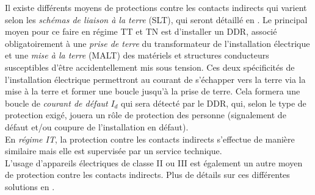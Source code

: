Il existe différents moyens de protections contre les contacts indirects qui varient selon les \emph{schémas de liaison à la terre} (SLT), qui seront détaillé en . Le principal moyen pour ce faire en régime TT et TN est d'installer un DDR, associé obligatoirement à une \emph{prise de terre} du transformateur de l'installation électrique et une \emph{mise à la terre} (MALT) des matériels et structures conducteurs susceptibles d'être accidentellement mis sous tension. Ces deux spécificités de l'installation électrique permettront au courant de s'échapper vers la terre via la mise à la terre et former une boucle jusqu'à la prise de terre. Cela formera une boucle de \emph{courant de défaut} $I_d$ qui sera détecté par le DDR, qui, selon le type de protection exigé, jouera un rôle de protection des personne (signalement de défaut et/ou coupure de l'installation en défaut).\\
En \emph{régime IT}, la protection contre les contacts indirects s'effectue de manière similaire mais elle est supervisée par un service technique.\\

L'usage d'appareils électriques de classe II ou III est également un autre moyen de protection contre les contacts indirects. Plus de détails sur ces différentes solutions en . 

%
